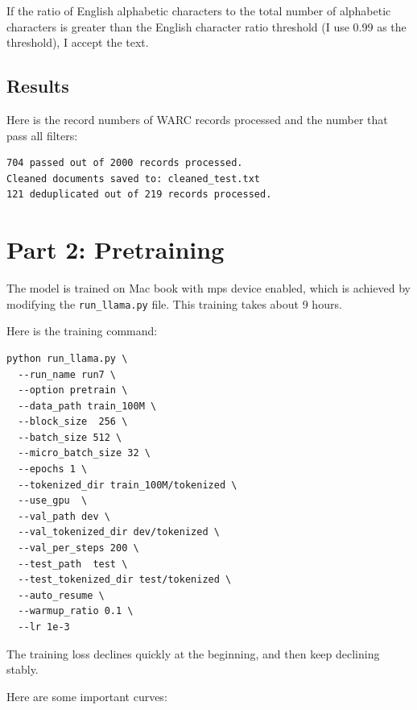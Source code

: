 \documentclass[11pt,a4paper]{article}
\begin{document}
If the ratio of English alphabetic characters to the total number of alphabetic characters is greater than the English character ratio threshold (I use 0.99 as the threshold), I accept the text.

\subsection{Results}

Here is the record numbers of WARC records processed and the number that pass all filters:


\begin{lstlisting}
704 passed out of 2000 records processed.
Cleaned documents saved to: cleaned_test.txt
121 deduplicated out of 219 records processed.
\end{lstlisting}

\section{Part 2: Pretraining}

The model is trained on Mac book with mps device enabled, which is achieved by modifying the \texttt{run\_llama.py} file. This training takes about 9 hours.

Here is the training command:
\begin{lstlisting}
python run_llama.py \
  --run_name run7 \
  --option pretrain \
  --data_path train_100M \
  --block_size  256 \
  --batch_size 512 \
  --micro_batch_size 32 \
  --epochs 1 \
  --tokenized_dir train_100M/tokenized \
  --use_gpu  \
  --val_path dev \
  --val_tokenized_dir dev/tokenized \
  --val_per_steps 200 \
  --test_path  test \
  --test_tokenized_dir test/tokenized \
  --auto_resume \
  --warmup_ratio 0.1 \
  --lr 1e-3 
\end{lstlisting}

The training loss declines quickly at the beginning, and then keep declining stably.

Here are some important curves:
\end{document}
